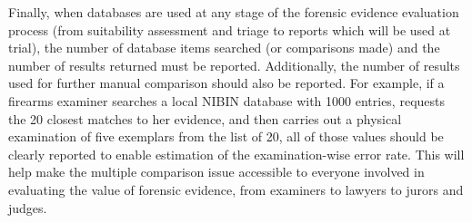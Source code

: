 \documentclass[9pt,twocolumn,twoside]{pnas-new}\usepackage[]{graphicx}\usepackage[dvipsnames]{xcolor}
\begin{document}
Finally, when databases are used at any stage of the forensic evidence evaluation process (from suitability assessment and triage to reports which will be used at trial), the number of database items searched (or comparisons made) and the number of results returned must be reported.
Additionally, the number of results used for further manual comparison should also be reported.
For example, if a firearms examiner searches a local NIBIN database with 1000 entries, requests the 20 closest matches to her evidence, and then carries out a physical examination of five exemplars from the list of 20, all of those values should be clearly reported to enable estimation of the examination-wise error rate.
This will help make the multiple comparison issue accessible to everyone involved in evaluating the value of forensic evidence, from examiners to lawyers to jurors and judges.



\showacknow{} %


\end{document}
